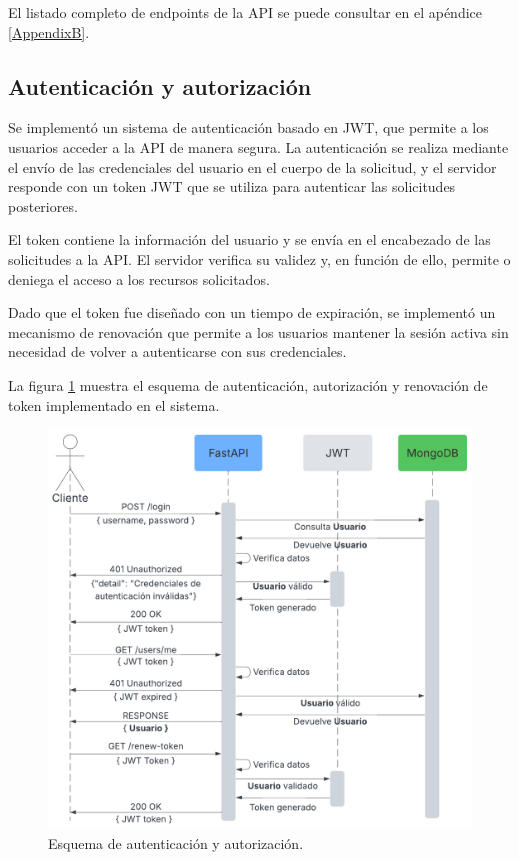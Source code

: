 El listado completo de endpoints de la API se puede consultar en el apéndice
\ref{AppendixB}.

\subsection{Autenticación y autorización}

Se implementó un sistema de autenticación basado en JWT, que permite a los
usuarios acceder a la API de manera segura. La autenticación se realiza
mediante el envío de las credenciales del usuario en el cuerpo de la solicitud,
y el servidor responde con un token JWT que se utiliza para autenticar las
solicitudes posteriores.

El token contiene la información del usuario y se envía en el encabezado de las
solicitudes a la API. El servidor verifica su validez y, en función de ello,
permite o deniega el acceso a los recursos solicitados.

Dado que el token fue diseñado con un tiempo de expiración, se implementó un
mecanismo de renovación que permite a los usuarios mantener la sesión activa
sin necesidad de volver a autenticarse con sus credenciales.

La figura \ref{fig:esquema autenticacion} muestra el esquema de autenticación,
autorización y renovación de token implementado en el sistema.

\begin{figure}[H]
    \centering
    \includegraphics[width=.78\textwidth]{./Images/17.png}
    \caption{Esquema de autenticación y autorización.}
    \label{fig:esquema autenticacion}
\end{figure}

